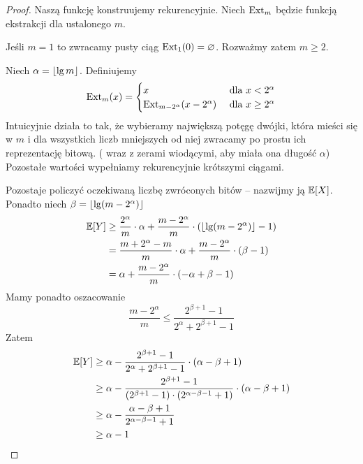 \begin{proof}
    Naszą funkcję konstruujemy rekurencyjnie. Niech \( \operatorname{Ext}_m \) będzie funkcją ekstrakcji dla ustalonego \( m \).
    
    Jeśli \( m = 1 \) to zwracamy pusty ciąg \( \operatorname{Ext}_1(0) = \varnothing \).
    Rozważmy zatem \( m \geq 2 \).
    
    Niech \( \alpha = \left\lfloor\lg m\right\rfloor \). Definiujemy
    \[
        \operatorname{Ext}_m(x) = \begin{cases}
            x & \text{ dla } x < 2^\alpha \\
            \operatorname{Ext}_{m - 2^\alpha}(x - 2^\alpha) & \text{ dla } x \geq 2^\alpha
        \end{cases}
    \]
    Intuicyjnie działa to tak, że wybieramy największą potęgę dwójki, która mieści się w \( m \)
    i dla wszystkich liczb mniejszych od niej zwracamy po prostu ich reprezentację bitową. (
    wraz z zerami wiodącymi, aby miała ona długość \( \alpha \))
    Pozostałe wartości wypełniamy rekurencyjnie krótszymi ciągami.
    
    Pozostaje policzyć oczekiwaną liczbę zwróconych bitów -- nazwijmy ją \( \expected{X} \).
    Ponadto niech \( \beta = \floor{\lg \pars{m - 2^\alpha}} \)
    \begin{align*}
        \expected{Y} 
            &\geq \frac{2^\alpha}{m} \cdot \alpha 
                + \frac{m - 2^\alpha}{m} \cdot \pars{\floor{\lg\pars{m - 2^\alpha}} - 1} \\
            &=\frac{m + 2^\alpha - m}{m} \cdot \alpha 
                + \frac{m - 2^\alpha}{m} \cdot \pars{\beta - 1} \\
            &= \alpha + \frac{m - 2^\alpha}{m} \cdot \pars{-\alpha + \beta - 1} \\
    \end{align*}
    Mamy ponadto oszacowanie
    \[
        \frac{m - 2^\alpha}{m} \leq \frac{2^{\beta + 1} - 1}{2^\alpha + 2^{\beta + 1} - 1}
    \]
    Zatem
    \begin{align*}
        \expected{Y} 
            &\geq \alpha - \frac{2^{\beta + 1} - 1}{2^\alpha + 2^{\beta + 1} - 1} \cdot (\alpha - \beta + 1)\\
            &\geq \alpha - \frac{2^{\beta + 1} - 1} {(2^{\beta + 1} - 1)\cdot(2^{\alpha - \beta - 1} + 1)} \cdot (\alpha - \beta + 1) \\
            &\geq \alpha - \frac{\alpha - \beta + 1}{2^{\alpha - \beta - 1} + 1} \\
            &\geq \alpha - 1
    \end{align*}
\end{proof}

